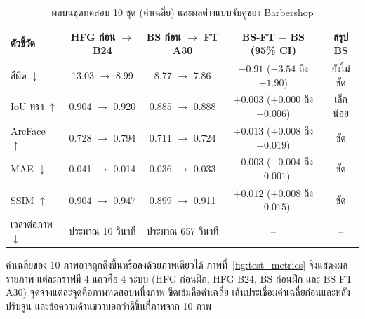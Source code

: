 \begin{table}[!htbp]
\centering
\caption{ผลบนชุดทดสอบ 10 ชุด (ค่าเฉลี่ย) และผลต่างแบบจับคู่ของ Barbershop}
\label{tab:test}
\footnotesize
\begin{tabular}{|l|c|c|c|c|}
\hline
\textbf{ตัวชี้วัด} & \textbf{HFG ก่อน $\rightarrow$ B24} & \textbf{BS ก่อน $\rightarrow$ FT A30}
& \textbf{BS-FT $-$ BS (95\% CI)} & \textbf{สรุป BS} \\ \hline
สีผิด $\downarrow$ & 13.03 $\rightarrow$ 8.99 & 8.77 $\rightarrow$ 7.86 & $-0.91$ ($-3.54$ ถึง $+1.90$) & ยังไม่ชัด \\ \hline
IoU ทรง $\uparrow$ & 0.904 $\rightarrow$ 0.920 & 0.885 $\rightarrow$ 0.888 & $+0.003$ ($+0.000$ ถึง $+0.006$) & เล็กน้อย \\ \hline
ArcFace $\uparrow$ & 0.728 $\rightarrow$ 0.794 & 0.711 $\rightarrow$ 0.724 & $+0.013$ ($+0.008$ ถึง $+0.019$) & ชัด \\ \hline
MAE $\downarrow$ & 0.041 $\rightarrow$ 0.014 & 0.036 $\rightarrow$ 0.033 & $-0.003$ ($-0.004$ ถึง $-0.001$) & ชัด \\ \hline
SSIM $\uparrow$ & 0.904 $\rightarrow$ 0.947 & 0.899 $\rightarrow$ 0.911 & $+0.012$ ($+0.008$ ถึง $+0.015$) & ชัด \\ \hline
เวลาต่อภาพ $\downarrow$ & ประมาณ 10 วินาที & ประมาณ 657 วินาที & -- & -- \\ \hline
\end{tabular}
\par\vspace{3pt}{\footnotesize\raggedright หมายเหตุ: HFG = HairFastGAN, B24 = น้ำหนักของ Trial B Epoch 24, BS = Barbershop ก่อนปรับจูน, BS-FT (Barbershop-FT) = Barbershop ที่ปรับจูนแล้ว (Fine-tuned), A30 = น้ำหนักของ Trial A Epoch 30, CI = Confidence Interval (ช่วงความเชื่อมั่น), IoU = Intersection over Union (สัดส่วนพื้นที่ผมที่ทับกัน), ArcFace = โมเดลจดจำใบหน้าที่ใช้วัดความเหมือนของใบหน้า, MAE = Mean Absolute Error (ค่าความคลาดเคลื่อนสัมบูรณ์เฉลี่ย), SSIM = Structural Similarity Index (ดัชนีความคล้ายเชิงโครงสร้าง)\par}

\end{table}

ค่าเฉลี่ยของ 10 ภาพอาจถูกดึงขึ้นหรือลงด้วยภาพเดียวได้ ภาพที่~\ref{fig:test_metrics} จึงแสดงผลรายภาพ
แต่ละกราฟมี 4 แถวคือ 4 ระบบ (HFG ก่อนฝึก, HFG B24, BS ก่อนฝึก และ BS-FT A30)
จุดจางแต่ละจุดคือภาพทดสอบหนึ่งภาพ ขีดเข้มคือค่าเฉลี่ย เส้นประเชื่อมค่าเฉลี่ยก่อนและหลังปรับจูน
และข้อความด้านขวาบอกว่าดีขึ้นกี่ภาพจาก 10 ภาพ

